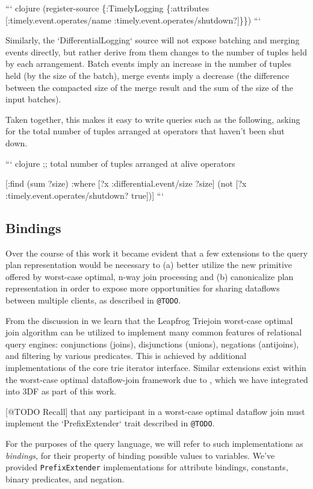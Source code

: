 \documentclass[../index.tex]{subfiles}
\begin{document}
``` clojure
(register-source
  \{:TimelyLogging
   \{:attributes [:timely.event.operates/name
                 :timely.event.operates/shutdown?]\}\})
```

Similarly, the `DifferentialLogging` source will not expose batching
and merging events directly, but rather derive from them changes to
the number of tuples held by each arrangement. Batch events imply an
increase in the number of tuples held (by the size of the batch),
merge events imply a decrease (the difference between the compacted
size of the merge result and the sum of the size of the input
batches).

Taken together, this makes it easy to write queries such as the
following, asking for the total number of tuples arranged at operators
that haven't been shut down.

``` clojure
;; total number of tuples arranged at alive operators

[:find (sum ?size)
 :where
 [?x :differential.event/size ?size]
 (not [?x :timely.event.operates/shutdown? true])]
```

\subsection{Bindings} \label{bindings}

Over the course of this work it became evident that a few extensions
to the query plan representation would be necessary to (a) better
utilize the new primitive offered by worst-case optimal, n-way join
processing and (b) canonicalize plan representation in order to expose
more opportunities for sharing dataflows between multiple clients, as
described in \texttt{@TODO}.

From the discussion in \cite{veldhuizen2012leapfrog} we learn that the
Leapfrog Triejoin worst-case optimal join algorithm can be utilized to
implement many common features of relational query engines:
conjunctions (joins), disjunctions (unions), negations (antijoins),
and filtering by various predicates. This is achieved by additional
implementations of the core trie iterator interface. Similar
extensions exist within the worst-case optimal dataflow-join framework
due to \cite{ammar2018distributed}, which we have integrated into 3DF
as part of this work.

[@TODO Recall] that any participant in a worst-case optimal dataflow
join must implement the `PrefixExtender` trait described in
\texttt{@TODO}.

For the purposes of the query language, we will refer to such
implementations as \emph{bindings}, for their property of binding
possible values to variables. We've provided \texttt{PrefixExtender}
implementations for attribute bindings, constants, binary predicates,
and negation.
\end{document}
